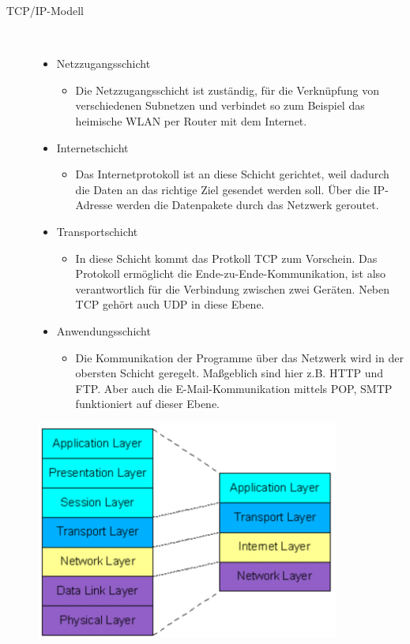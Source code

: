 \documentclass[a4paper,12pt]{article}
\begin{document}
\newpage
\noindent
\begin{description}
    \item[TCP/IP-Modell] ~\par
    \begin{itemize}
        \item Netzzugangsschicht
        \begin{itemize}
            \item{Die Netzzugangsschicht ist zuständig, für die Verknüpfung von verschiedenen Subnetzen und verbindet so zum Beispiel das heimische WLAN per Router mit dem Internet.}
        \end{itemize}
        \item Internetschicht
        \begin{itemize}
            \item{Das Internetprotokoll ist an diese Schicht gerichtet, weil dadurch die Daten an das richtige Ziel gesendet werden soll.  Über die IP-Adresse werden die Datenpakete durch das Netzwerk geroutet.}
        \end{itemize}
        \item Transportschicht
        \begin{itemize}
            \item{In diese Schicht kommt das Protkoll TCP zum Vorschein.  Das Protokoll ermöglicht die Ende-zu-Ende-Kommunikation, ist also verantwortlich für die Verbindung zwischen zwei Geräten. Neben TCP gehört auch UDP in diese Ebene.}
        \end{itemize}
        \item Anwendungsschicht
        \begin{itemize}
            \item{Die Kommunikation der Programme über das Netzwerk wird in der obersten Schicht geregelt. Maßgeblich sind hier z.B. HTTP und FTP. Aber auch die E-Mail-Kommunikation mittels POP, SMTP funktioniert auf dieser Ebene.}
        \end{itemize}
    \end{itemize} 
\end{description}
\begin{figure}[h]
    \centering
    \includegraphics[width=10cm]{ositcpip.png}
\end{figure}
\cite{tcpip}
\newpage
\noindent
\end{document}
